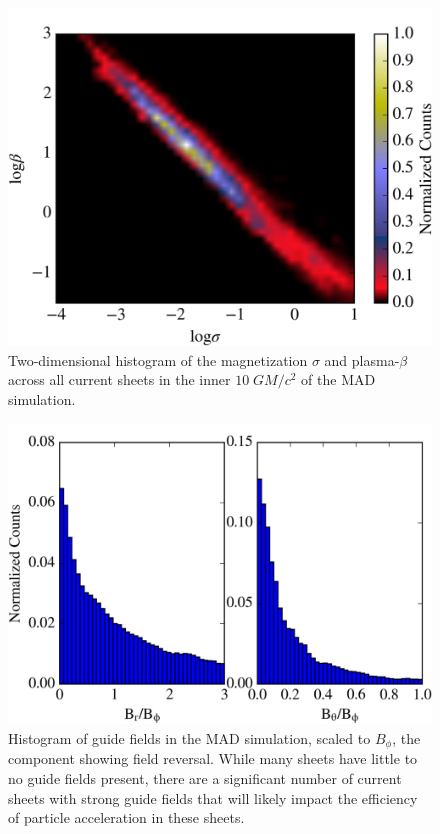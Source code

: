 \begin{figure}[!h]
	\centering
	\includegraphics[width =\textwidth]{paper2_fig7.jpg}
	\caption{Two-dimensional histogram of the magnetization $\sigma$ and plasma-$\beta$ across all current sheets in the inner $10 \; GM/c^2$ of the MAD simulation.}
	\label{MAD_hist}
\end{figure}

\begin{figure}[!h]
	\centering
	\includegraphics[width =\textwidth]{paper2_fig8.jpg}
	\caption{Histogram of guide fields in the MAD simulation, scaled to $B_{\phi}$, the component showing field reversal. While many sheets have little to no guide fields present, there are a significant number of current sheets with strong guide fields that will likely impact the efficiency of particle acceleration in these sheets.}
	\label{MAD_bguide}
\end{figure}


